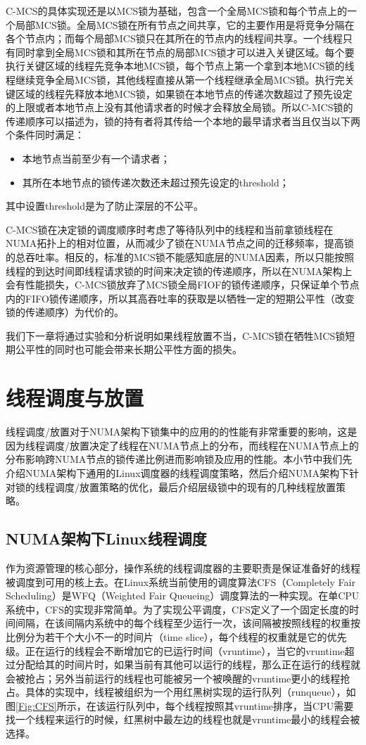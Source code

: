 C-MCS的具体实现还是以MCS锁为基础，包含一个全局MCS锁和每个节点上的一个局部MCS锁。全局MCS锁在所有节点之间共享，它的主要作用是将竞争分隔在各个节点内；而每个局部MCS锁只在其所在的节点内的线程间共享。一个线程只有同时拿到全局MCS锁和其所在节点的局部MCS锁才可以进入关键区域。每个要执行关键区域的线程先竞争本地MCS锁，每个节点上第一个拿到本地MCS锁的线程继续竞争全局MCS锁，其他线程直接从第一个线程继承全局MCS锁。执行完关键区域的线程先释放本地MCS锁，如果锁在本地节点的传递次数超过了预先设定的上限或者本地节点上没有其他请求者的时候才会释放全局锁。所以C-MCS锁的传递顺序可以描述为，锁的持有者将其传给一个本地的最早请求者当且仅当以下两个条件同时满足：
\begin{itemize}
\item  本地节点当前至少有一个请求者；
\item  其所在本地节点的锁传递次数还未超过预先设定的threshold；
\end{itemize}
其中设置threshold是为了防止深层的不公平。

C-MCS锁在决定锁的调度顺序时考虑了等待队列中的线程和当前拿锁线程在NUMA拓扑上的相对位置，从而减少了锁在NUMA节点之间的迁移频率，提高锁的总吞吐率。相反的，标准的MCS锁不能感知底层的NUMA因素，所以只能按照线程的到达时间即线程请求锁的时间来决定锁的传递顺序，所以在NUMA架构上会有性能损失，C-MCS锁放弃了MCS锁全局FIOF的锁传递顺序，只保证单个节点内的FIFO锁传递顺序，所以其高吞吐率的获取是以牺牲一定的短期公平性（改变锁的传递顺序）为代价的。

我们下一章将通过实验和分析说明如果线程放置不当，C-MCS锁在牺牲MCS锁短期公平性的同时也可能会带来长期公平性方面的损失。

\section{线程调度与放置}

线程调度/放置对于NUMA架构下锁集中的应用的的性能有非常重要的影响\cite{pusukuri2014shuffling}，这是因为线程调度/放置决定了线程在NUMA节点上的分布，而线程在NUMA节点上的分布影响跨NUMA节点的锁传递比例进而影响锁及应用的性能。本小节中我们先介绍NUMA架构下通用的Linux调度器的线程调度策略，然后介绍NUMA架构下针对锁的线程调度/放置策略的优化，最后介绍层级锁中的现有的几种线程放置策略。
\subsection{NUMA架构下Linux线程调度}
作为资源管理的核心部分，操作系统的线程调度器的主要职责是保证准备好的线程被调度到可用的核上去。在Linux系统当前使用的调度算法CFS（Completely Fair Scheduling）\cite{lozi2016linux}是WFQ（Weighted Fair Queueing）调度算法的一种实现。在单CPU系统中，CFS的实现非常简单。为了实现公平调度，CFS定义了一个固定长度的时间间隔，在该间隔内系统中的每个线程至少运行一次，该间隔被按照线程的权重按比例分为若干个大小不一的时间片（time slice），每个线程的权重就是它的优先级。正在运行的线程会不断增加它的已运行时间（vruntime），当它的vruntime超过分配给其的时间片时，如果当前有其他可以运行的线程，那么正在运行的线程就会被抢占；另外当前运行的线程也可能被另一个被唤醒的vruntime更小的线程抢占。具体的实现中，线程被组织为一个用红黑树实现的运行队列（runqueue），如图\ref{Fig:CFS}所示，在该运行队列中，每个线程按照其vruntime排序，当CPU需要找一个线程来运行的时候，红黑树中最左边的线程也就是vruntime最小的线程会被选择。

